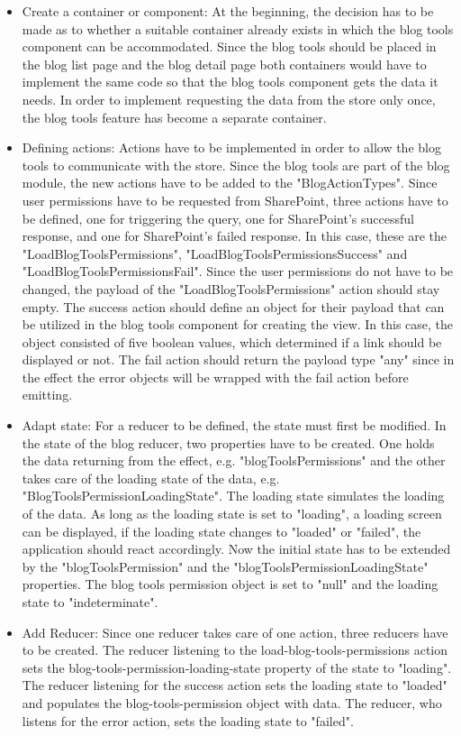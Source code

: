 \documentclass[Bachelor,BIF,english]{twbook}
\begin{document}
\begin{itemize}
\item Create a container or component: At the beginning, the decision has to be made as to whether a suitable container already exists in which the blog tools component can be accommodated. Since the blog tools should be placed in the blog list page and the blog detail page both containers would have to implement the same code so that the blog tools component gets the data it needs. In order to implement requesting the data from the store only once, the blog tools feature has become a separate container.
\item Defining actions: Actions have to be implemented in order to allow the blog tools to communicate with the store. Since the blog tools are part of the blog module, the new actions have to be added to the "BlogActionTypes". Since user permissions have to be requested from SharePoint, three actions have to be defined, one for triggering the query, one for SharePoint's successful response, and one for SharePoint's failed response. In this case, these are the "LoadBlogToolsPermissions", "LoadBlogToolsPermissionsSuccess" and "LoadBlogToolsPermissionsFail". Since the user permissions do not have to be changed, the payload of the "LoadBlogToolsPermissions" action should stay empty. The success action should define an object for their payload that can be utilized in the blog tools component for creating the view. In this case, the object consisted of five boolean values, which determined if a link should be displayed or not. The fail action should return the payload type "any" since in the effect the error objects will be wrapped with the fail action before emitting.
\item Adapt state: For a reducer to be defined, the state must first be modified. In the state of the blog reducer, two properties have to be created. One holds the data returning from the effect, e.g. "blogToolsPermissions" and the other takes care of the loading state of the data, e.g. "BlogToolsPermissionLoadingState". The loading state simulates the loading of the data. As long as the loading state is set to "loading", a loading screen can be displayed, if the loading state changes to "loaded" or "failed", the application should react accordingly. Now the initial state has to be extended by the "blogToolsPermission" and the "blogToolsPermissionLoadingState" properties. The blog tools permission object is set to "null" and the loading state to "indeterminate".
\item Add Reducer: Since one reducer takes care of one action, three reducers have to be created. The reducer listening to the load-blog-tools-permissions action sets the blog-tools-permission-loading-state property of the state to "loading". The reducer listening for the success action sets the loading state to "loaded" and populates the blog-tools-permission object with data. The reducer, who listens for the error action, sets the loading state to "failed".

\end{itemize}
\end{document}
